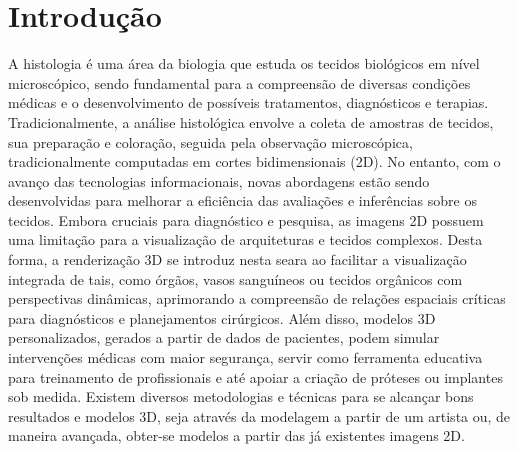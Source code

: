 \section{Introdução}
\label{sec:introducao}

A histologia é uma área da biologia que estuda os tecidos biológicos em nível microscópico, sendo fundamental para a compreensão de diversas condições médicas e o desenvolvimento de possíveis tratamentos, diagnósticos e terapias. Tradicionalmente, a análise histológica envolve a coleta de amostras de tecidos, sua preparação e coloração, seguida pela observação microscópica, tradicionalmente computadas em cortes bidimensionais (2D). No entanto, com o avanço das tecnologias informacionais, novas abordagens estão sendo desenvolvidas para melhorar a eficiência das avaliações e inferências sobre os tecidos. Embora cruciais para diagnóstico e pesquisa, as imagens 2D possuem uma limitação para a visualização de arquiteturas e tecidos complexos. Desta forma, a renderização 3D se introduz nesta seara ao facilitar a visualização integrada de tais, como órgãos, vasos sanguíneos ou tecidos orgânicos com perspectivas dinâmicas, aprimorando a compreensão de relações espaciais críticas para diagnósticos e planejamentos cirúrgicos. Além disso, modelos 3D personalizados, gerados a partir de dados de pacientes, podem simular intervenções médicas com maior segurança, servir como ferramenta educativa para treinamento de profissionais e até apoiar a criação de próteses ou implantes sob medida. Existem diversos metodologias e técnicas para se alcançar bons resultados e modelos 3D, seja através da modelagem a partir de um artista ou, de maneira avançada, obter-se modelos a partir das já existentes imagens 2D.

